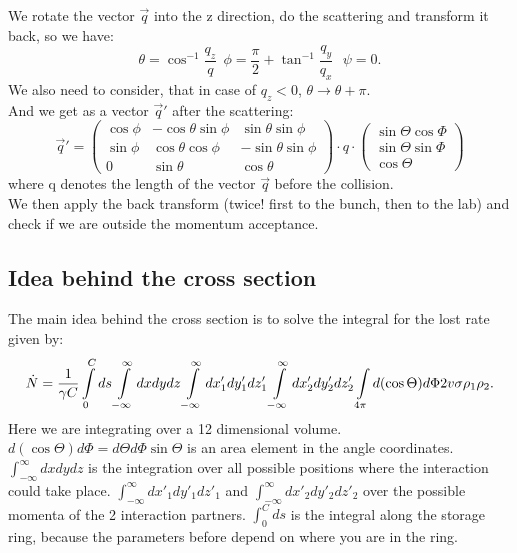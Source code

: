 We rotate the vector $\vec q$ into the z direction, do the scattering and transform it back, so we have:
\begin{equation} \theta = \cos^{-1} \frac {q_z} q \ \ \phi = \frac \pi 2 + \tan^{-1} \frac {q_y}{q_x} \ \ \ \psi = 0. \end{equation}
We also need to consider, that in case of $q_z < 0$, $\theta \rightarrow \theta + \pi$.\\
And we get as a vector $\vec q'$ after the scattering:
\begin{equation} \vec q' = \left(\begin{array}{ccc}
\cos \phi & - \cos \theta \sin \phi & \sin \theta \sin \phi \\
\sin \phi & \cos \theta \cos \phi & - \sin \theta \sin \phi \\
0 & \sin \theta & \cos \theta \end{array} \right) \cdot q \cdot
\left( \begin{array}{c} \sin \Theta \cos \Phi \\ \sin \Theta \sin \Phi \\ \cos \Theta \end{array} \right) \end{equation}
where q denotes the length of the vector $\vec q$ before the collision.\\
We then apply the back transform (twice! first to the bunch, then to the lab) and check if we are outside the momentum acceptance.

\subsection{Idea behind the cross section}
The main idea behind the cross section is to solve the integral for the lost rate given by:
\begin{equation} \dot N = \frac 1 {\gamma C} \int\limits_0^C ds \\
\int\limits_{-\infty}^\infty dx dy dz \\
\int\limits_{-\infty}^\infty dx'_1 dy'_1 dz'_1 \\
\int\limits_{-\infty}^\infty dx'_2 dy'_2 dz'_2 \\
\int\limits_{4 \pi} d(\cos\Theta) d\Phi 2v \sigma \rho_1 \rho_2. \end{equation}
Here we are integrating over a 12 dimensional volume. $d(\cos \Theta) d\Phi = d\Theta d\Phi \sin \Theta$ is an area element in the angle coordinates. $\int_{-\infty}^\infty dx dy dz$ is the integration over all possible positions where the interaction could take place. $\int_{-\infty}^\infty dx'_1 dy'_1 dz'_1$ and $\int_{-\infty}^\infty dx'_2 dy'_2 dz'_2$ over the possible momenta of the 2 interaction partners. $\int_0^C ds$ is the integral along the storage ring, because the parameters before depend on where you are in the ring.
